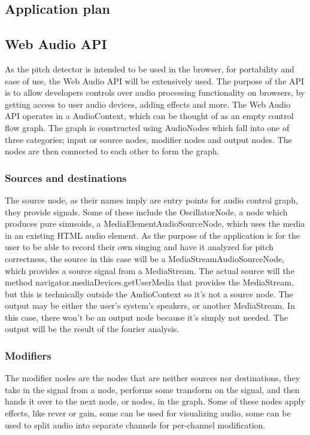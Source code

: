 \subsection{Application plan}
\subsection{Web Audio API}
As the pitch detector is intended to be used in the browser, for portability and ease of use, the Web Audio API will be extensively used. The purpose of the API is to allow developers controls over audio processing functionality on browsers, by getting access to user audio devices, adding effects and more. 
The Web Audio API operates in a AudioContext, which can be thought of as an empty control flow graph. The graph is constructed using AudioNodes which fall into one of three categories; input or source nodes, modifier nodes and output nodes. The nodes are then connected to each other to form the graph.

\subsubsection{Sources and destinations}
The source node, as their names imply are entry points for audio control graph, they provide signals. Some of these include the OscillatorNode, a node which produces pure sinusoids, a MediaElementAudioSourceNode, which uses the media in an existing HTML audio element. As the purpose of the application is for the user to be able to record their own singing and have it analyzed for pitch correctness, the source in this case will be a MediaStreamAudioSourceNode, which provides a source signal from a MediaStream. The actual source will the method navigator.mediaDevices.getUserMedia\(\) that provides the MediaStream, but this is technically outside the AudioContext so it's not a source node.  
The output may be either the user's system's speakers, or another MediaStream. In this case, there won't be an output node because it's simply not needed. The output will be the result of the fourier analysis.

\subsubsection{Modifiers} 
The modifier nodes are the nodes that are neither sources nor destinations, they take in the signal from a node, performs some transform on the signal, and then hands it over to the next node, or nodes, in the graph. Some of these nodes apply effects, like rever or gain, some can be used for visualizing audio, some can be used to split audio into separate channels for per-channel modification.

